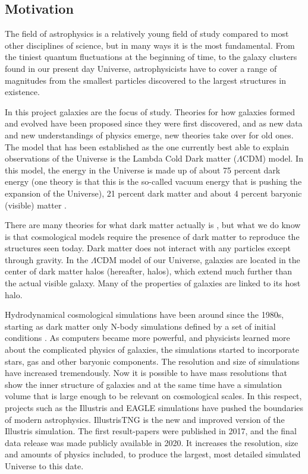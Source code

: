 
\noindent
\subsection{Motivation}
The field of astrophysics is a relatively young field of study compared to most other disciplines of science, but in many ways it is the most fundamental. From the tiniest quantum fluctuations at the beginning of time, to the galaxy clusters found in our present day Universe, astrophysicists have to cover a range of magnitudes from the smallest particles discovered to the largest structures in existence. 

In this project galaxies are the focus of study. Theories for how galaxies formed and evolved have been proposed since they were first discovered, and as new data and new understandings of physics emerge, new theories take over for old ones. The model that has been established as the one currently best able to explain observations of the Universe is the Lambda Cold Dark matter ($\Lambda$CDM) model. In this model, the energy in the Universe is made up of about 75 percent dark energy (one theory is that this is the so-called vacuum energy that is pushing the expansion of the Universe), 21 percent dark matter and about 4 percent baryonic (visible) matter \parencite{Planck2016}. 

There are many theories for what dark matter actually is \parencite[see e.g.,][]{Boveia2018}, but what we do know is that cosmological models require the presence of dark matter to reproduce the structures seen today. Dark matter does not interact with any particles except through gravity. In the $\Lambda$CDM model of our Universe, galaxies are located in the center of dark matter halos (hereafter, halos), which extend much further than the actual visible galaxy. Many of the properties of galaxies are linked to its host halo.

Hydrodynamical cosmological simulations have been around since the 1980s, starting as dark matter only N-body simulations defined by a set of initial conditions \parencite{Frenk1983}. As computers became more powerful, and physicists learned more about the complicated physics of galaxies, the simulations started to incorporate stars, gas and other baryonic components. The resolution and size of simulations have increased tremendously. Now it is possible to have mass resolutions that show the inner structure of galaxies and at the same time have a simulation volume that is large enough to be relevant on cosmological scales. In this respect, projects such as the Illustris and EAGLE simulations have pushed the boundaries of modern astrophysics. IllustrisTNG is the new and improved version of the Illustris simulation. The first result-papers were published in 2017, and the final data release was made publicly available in 2020. It increases the resolution, size and amounts of physics included, to produce the largest, most detailed simulated Universe to this date. 

